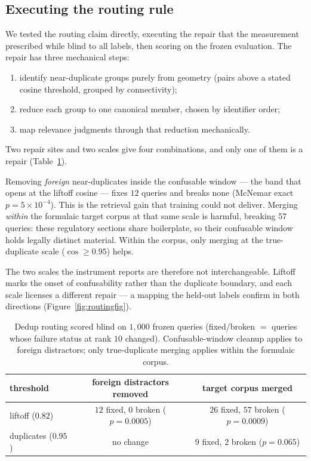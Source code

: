 \documentclass[11pt,letterpaper]{article}
\begin{document}
\subsection{Executing the routing rule}
\label{sec:routing}

We tested the routing claim directly, executing the repair that the
measurement prescribed while blind to all labels, then scoring on the
frozen evaluation. The repair has three mechanical steps:
\begin{enumerate}
\item identify near-duplicate groups purely from geometry (pairs above a
  stated cosine threshold, grouped by connectivity);
\item reduce each group to one canonical member, chosen by identifier
  order;
\item map relevance judgments through that reduction mechanically.
\end{enumerate} Two repair sites and two scales give four combinations,
and only one of them is a repair (Table~\ref{tab:routing}).

Removing \emph{foreign} near-duplicates inside the confusable window ---
the band that opens at the liftoff cosine --- fixes $12$ queries and
breaks none (McNemar exact $p = 5 \times 10^{-4}$). This is the retrieval
gain that training could not deliver. Merging \emph{within} the formulaic
target corpus at that same scale is harmful, breaking $57$ queries: these
regulatory sections share boilerplate, so their confusable window holds
legally distinct material. Within the corpus, only merging at the
true-duplicate scale ($\cos \ge 0.95$) helps.

The two scales the instrument reports are therefore not interchangeable.
Liftoff marks the onset of confusability rather than the duplicate
boundary, and
each scale licenses a different repair --- a mapping the held-out labels
confirm in both directions (Figure~\ref{fig:routingfig}).

\begin{table}[t]
\centering
\caption{Dedup routing scored blind on $1{,}000$ frozen queries
(fixed/broken $=$ queries whose failure status at rank $10$ changed).
Confusable-window cleanup applies to foreign distractors; only
true-duplicate merging applies within the formulaic corpus.}
\label{tab:routing}
\small
\begin{tabular}{lcc}
\toprule
threshold & foreign distractors removed & target corpus merged\\
\midrule
liftoff ($0.82$) & $12$ fixed, $0$ broken ($p{=}0.0005$) & $26$ fixed, $57$ broken ($p{=}0.0009$)\\
duplicates ($0.95$) & no change & $9$ fixed, $2$ broken ($p{=}0.065$)\\
\bottomrule
\end{tabular}
\end{table}
\end{document}
